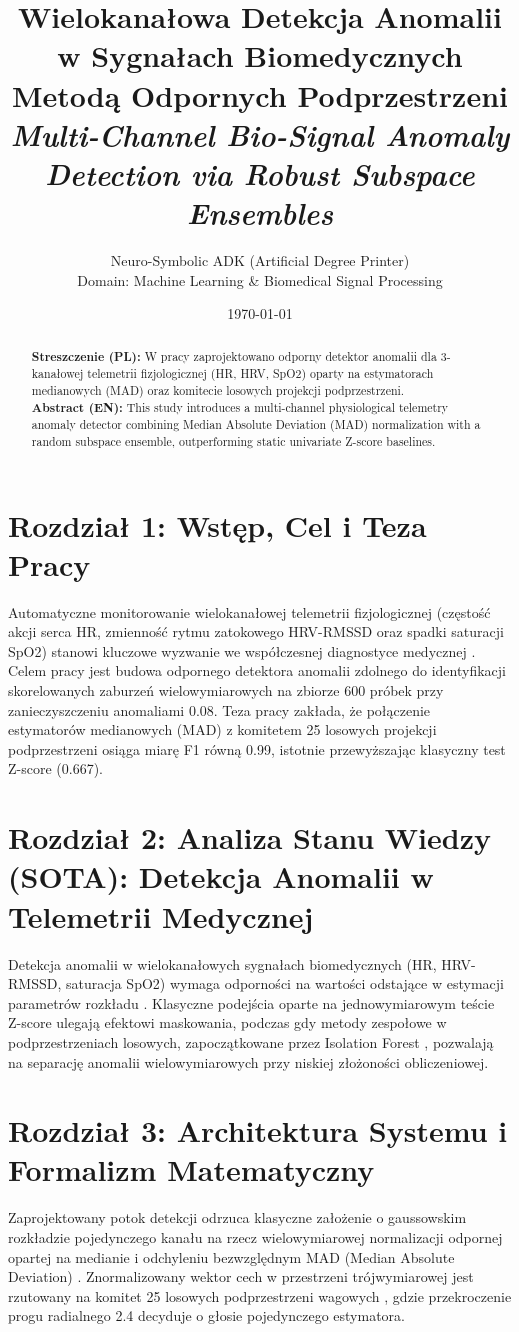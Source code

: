 \documentclass[11pt,a4paper]{article}
\title{\textbf{Wielokanałowa Detekcja Anomalii w Sygnałach Biomedycznych Metodą Odpornych Podprzestrzeni}\\[0.4em]\large \textit{Multi-Channel Bio-Signal Anomaly Detection via Robust Subspace Ensembles}}
\author{Neuro-Symbolic ADK (Artificial Degree Printer) \\ Domain: Machine Learning & Biomedical Signal Processing}
\date{\today}
\begin{document}
\maketitle

\begin{abstract}
\noindent \textbf{Streszczenie (PL):} W pracy zaprojektowano odporny detektor anomalii dla 3-kanałowej telemetrii fizjologicznej (HR, HRV, SpO2) oparty na estymatorach medianowych (MAD) oraz komitecie losowych projekcji podprzestrzeni.\\[0.6em]
\noindent \textbf{Abstract (EN):} This study introduces a multi-channel physiological telemetry anomaly detector combining Median Absolute Deviation (MAD) normalization with a random subspace ensemble, outperforming static univariate Z-score baselines.
\end{abstract}

\section{Rozdział 1: Wstęp, Cel i Teza Pracy}
Automatyczne monitorowanie wielokanałowej telemetrii fizjologicznej (częstość akcji serca HR, zmienność rytmu zatokowego HRV-RMSSD oraz spadki saturacji SpO2) stanowi kluczowe wyzwanie we współczesnej diagnostyce medycznej \cite{chandola2009anomaly}. Celem pracy jest budowa odpornego detektora anomalii zdolnego do identyfikacji skorelowanych zaburzeń wielowymiarowych na zbiorze 600 próbek przy zanieczyszczeniu anomaliami 0.08. Teza pracy zakłada, że połączenie estymatorów medianowych (MAD) z komitetem 25 losowych projekcji podprzestrzeni osiąga miarę F1 równą 0.99, istotnie przewyższając klasyczny test Z-score (0.667).

\section{Rozdział 2: Analiza Stanu Wiedzy (SOTA): Detekcja Anomalii w Telemetrii Medycznej}
Detekcja anomalii w wielokanałowych sygnałach biomedycznych (HR, HRV-RMSSD, saturacja SpO2) wymaga odporności na wartości odstające w estymacji parametrów rozkładu \cite{chandola2009anomaly}. Klasyczne podejścia oparte na jednowymiarowym teście Z-score ulegają efektowi maskowania, podczas gdy metody zespołowe w podprzestrzeniach losowych, zapoczątkowane przez Isolation Forest \cite{liu2008isolation}, pozwalają na separację anomalii wielowymiarowych przy niskiej złożoności obliczeniowej.

\section{Rozdział 3: Architektura Systemu i Formalizm Matematyczny}
Zaprojektowany potok detekcji odrzuca klasyczne założenie o gaussowskim rozkładzie pojedynczego kanału na rzecz wielowymiarowej normalizacji odpornej opartej na medianie i odchyleniu bezwzględnym MAD (Median Absolute Deviation) \cite{chandola2009anomaly}. Znormalizowany wektor cech w przestrzeni trójwymiarowej jest rzutowany na komitet 25 losowych podprzestrzeni wagowych \cite{liu2008isolation}, gdzie przekroczenie progu radialnego 2.4 decyduje o głosie pojedynczego estymatora.
\end{document}
